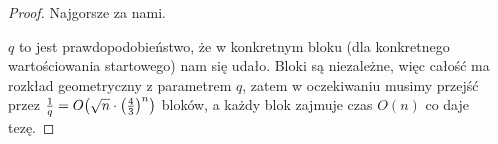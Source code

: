 \begin{proof}
	Najgorsze za nami.

	\( q \) to jest prawdopodobieństwo, że w konkretnym bloku (dla konkretnego wartościowania startowego) nam się udało.
	Bloki są niezależne, więc całość ma rozkład geometryczny z parametrem \( q \),
	zatem w oczekiwaniu musimy przejść przez \( \frac{1}{q} = O\pars{\sqrt{n} \cdot \pars{\frac{4}{3}}^n}\) bloków, a każdy blok zajmuje czas \( O(n) \) co daje tezę.
\end{proof}
